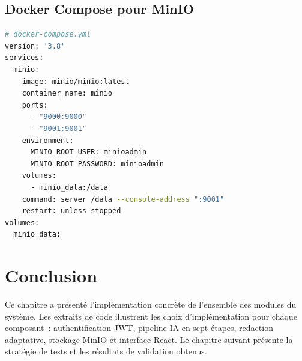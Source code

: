 \subsection{Docker Compose pour MinIO}

\begin{lstlisting}[language=bash, caption={docker-compose.yml -- service MinIO}, label={lst:docker}]
# docker-compose.yml
version: '3.8'
services:
  minio:
    image: minio/minio:latest
    container_name: minio
    ports:
      - "9000:9000"
      - "9001:9001"
    environment:
      MINIO_ROOT_USER: minioadmin
      MINIO_ROOT_PASSWORD: minioadmin
    volumes:
      - minio_data:/data
    command: server /data --console-address ":9001"
    restart: unless-stopped
volumes:
  minio_data:
\end{lstlisting}

\section*{Conclusion}
Ce chapitre a présenté l'implémentation concrète de l'ensemble des modules du système. Les extraits de code illustrent les choix d'implémentation pour chaque composant~: authentification JWT, pipeline IA en sept étapes, redaction adaptative, stockage MinIO et interface React. Le chapitre suivant présente la stratégie de tests et les résultats de validation obtenus.
